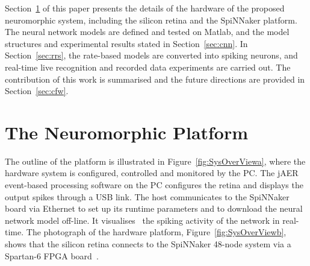 \documentclass[journal]{journal}
\begin{document}
Section~\ref{sec:np} of this paper presents the details of the hardware of the proposed neuromorphic system, including the silicon retina and the SpiNNaker platform.
The neural network models are defined and tested on Matlab, and the model structures and experimental results stated in Section~\ref{sec:cnn}.
In Section~\ref{sec:rrs}, the rate-based models are converted into spiking neurons, and real-time live recognition and recorded data experiments are carried out.
The contribution of this work is summarised and the future directions are provided in Section~\ref{sec:cfw}.

\section{The Neuromorphic Platform}
\label{sec:np}
The outline of the platform is illustrated in Figure~\ref{fig:SysOverViewa}, where the hardware system is configured, controlled and monitored by the PC.
The jAER~\cite{delbruck2008frame} event-based processing software on the PC configures the retina and displays the output spikes through a USB link.
The host communicates to the SpiNNaker board via Ethernet to set up its runtime parameters and to download the neural network model off-line.
It visualises~\cite{6252490} the spiking activity of the network in real-time.
The photograph of the hardware platform, Figure~\ref{fig:SysOverViewb}, shows that the silicon retina connects to the SpiNNaker 48-node system via a Spartan-6 FPGA board~\cite{galluppi2012real}.
\end{document}
